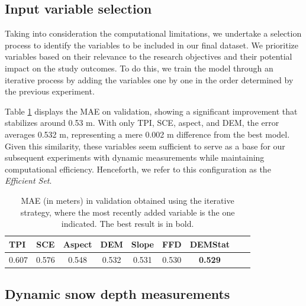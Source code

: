 \documentclass[preprint,12pt]{elsarticle}
\begin{document}
\subsection{Input variable selection}

Taking into consideration the computational limitations, we undertake a selection process to identify the variables to be included in our final dataset. We prioritize variables based on their relevance to the research objectives and their potential impact on the study outcomes. To do this, we train the model through an iterative process by adding the variables one by one in the order determined by the previous experiment.

Table \ref{Tab:Iterative} displays the MAE on validation, showing a significant improvement that stabilizes around 0.53 m. With only TPI, SCE, aspect, and DEM, the error averages 0.532 m, representing a mere 0.002 m difference from the best model. Given this similarity, these variables seem sufficient to serve as a base for our subsequent experiments with dynamic measurements while maintaining computational efficiency. Henceforth, we refer to this configuration as the \textit{Efficient Set}.

\begin{table}[htbp]
\caption{ MAE (in meters) in validation obtained using the iterative strategy, where the most recently added variable is the one indicated. The best result is in bold.} 
\label{Tab:Iterative}
\centering
\begin{tabular}{lcccccccc}
\hline
TPI & SCE & Aspect & DEM & Slope & FFD & DEMStat \\ \hline
0.607 & 0.576 & 0.548 & 0.532 & 0.531 & 0.530 & \textbf{0.529} \\ \hline
\end{tabular}
\end{table}

\subsection{Dynamic snow depth measurements}
\label{subsec:otras_temp}
\end{document}
